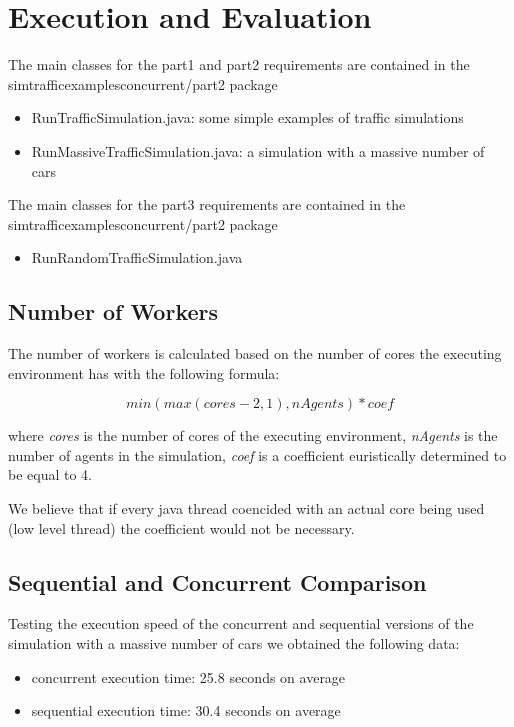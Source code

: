 \documentclass[12pt, a4paper]{report}
\begin{document}
\chapter{Execution and Evaluation}
The main classes for the part1 and part2 requirements are contained in the simtrafficexamplesconcurrent/part2 package
\begin{itemize}
    \item RunTrafficSimulation.java: some simple examples of traffic simulations
    \item RunMassiveTrafficSimulation.java: a simulation with a massive number of cars
\end{itemize}

The main classes for the part3 requirements are contained in the simtrafficexamplesconcurrent/part2 package
\begin{itemize}
    \item RunRandomTrafficSimulation.java
\end{itemize}

\section{Number of Workers}
The number of workers  is calculated based on the number of cores the executing environment has with the following
 formula:

\[min(max(cores - 2, 1), nAgents) * coef\]

where \emph{cores} is the number of cores of the executing environment, \emph{nAgents} is the number of agents in the simulation,
 \emph{coef} is a coefficient euristically determined to be equal to 4.

We believe that if every java thread coencided with an actual core being used (low level thread) the coefficient
 would not be necessary. 

\section{Sequential and Concurrent Comparison}
Testing the execution speed of the concurrent and sequential versions of the simulation with a massive number of cars
 we obtained the following data:
\begin{itemize}
    \item concurrent execution time: 25.8 seconds on average
    \item sequential execution time: 30.4 seconds on average
\end{itemize}



\end{document}
